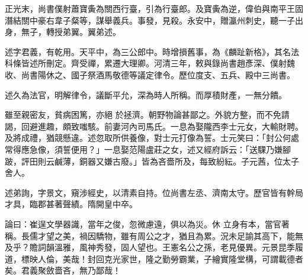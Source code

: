 \begin{pinyinscope}
 正光末，尚書僕射蕭寶夤為關西行臺，引為行臺郎。及寶夤為逆，偉伯與南平王固潛結關中豪右韋子粲等，謀舉義兵。事發，見殺。永安中，贈瀛州刺史，聽一子出身，無子，轉授弟翼。翼弟述。



 述字君義，有乾用。天平中，為三公郎中。時增損舊事，為《麟趾新格》，其名法科條皆述所刪定。齊受禪，累遷大理卿。河清三年，敕與錄尚書趙彥深、僕射魏收、尚書陽休之、國子祭酒馬敬德等議定律令。歷位度支、五兵、殿中三尚書。



 述久為法官，明解律令，議斷平允，深為時人所稱。而厚積財產，一無分饋。



 雖至親密友，貧病困篤，亦絕
 於拯濟。朝野物論甚鄙之。外貌方整，而不免請謁，回避進趣，頗致嗤駭。前妻河內司馬氏。一息為娶隴西李士元女，大輸財聘。及將成禮，猶競懸違。述忽取所供養像，對士元打像為誓。士元笑曰：「封公何處常得應急像，須誓便用？」一息娶范陽盧莊之女，述又經府訴云：「送騍乃嫌腳跛，評田則云鹹薄，銅器又嫌古廢。」皆為吝嗇所及，每致紛紜。子元茜，位太子舍人。



 述弟詢，字景文，窺涉經史，以清素自持。位尚書左丞、濟南太守。歷官皆有幹局才具，臨郡甚著聲績。隋開皇中卒。



 論曰：崔逞文學器識，當年之俊，忽微慮遠，俱以為災。休
 立身有本，當官著稱。長儒才望之美，禍因驕物，雖有周公之才，猶且為累。況未足諭其高下，能無及乎？贍詞韻溫雅，風神秀發，固人望也。王憲名公之孫，老見優異。元景昆季履道，標映人倫，美哉！封回克光家世，隆之勤勞霸業，子繪實隆堂構，可謂載德者矣。君義聚斂嗇吝，無乃鄙哉！



\end{pinyinscope}